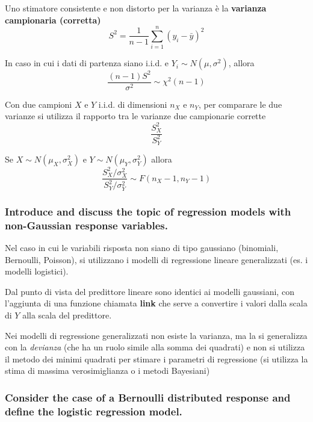 \documentclass[
]{article}
\begin{document}
Uno stimatore consistente e non distorto per la varianza è la
\textbf{varianza campionaria (corretta)}
\[S^2 = \frac{1}{n-1}\sum_{i=1}^n (y_i - \bar{y})^2\]

In caso in cui i dati di partenza siano i.i.d. e
\(Y_i \sim N(\mu, \sigma^2)\), allora
\[ \frac{(n-1)S^2}{\sigma^2} \sim \chi^2(n-1)\]

Con due campioni \(X\) e \(Y\) i.i.d. di dimensioni \(n_X\) e \(n_Y\),
per comparare le due varianze si utilizza il rapporto tra le varianze
due campionarie corrette \[\frac{S_X^2}{S_Y^2}\]

Se \(X \sim N(\mu_X, \sigma_X^2)\) e \(Y \sim N(\mu_Y, \sigma_Y^2)\)
allora
\[ \frac{S_X^2/\sigma_X^2}{S_Y^2/\sigma_Y^2} \sim F(n_X-1, n_Y -1) \]

\hypertarget{introduce-and-discuss-the-topic-of-regression-models-with-non-gaussian-response-variables.}{%
\subsubsection{Introduce and discuss the topic of regression models with
non-Gaussian response
variables.}\label{introduce-and-discuss-the-topic-of-regression-models-with-non-gaussian-response-variables.}}

Nel caso in cui le variabili risposta non siano di tipo gaussiano
(binomiali, Bernoulli, Poisson), si utilizzano i modelli di regressione
lineare generalizzati (es. i modelli logistici).

Dal punto di vista del predittore lineare sono identici ai modelli
gaussiani, con l'aggiunta di una funzione chiamata \textbf{link} che
serve a convertire i valori dalla scala di \(Y\) alla scala del
predittore.

Nei modelli di regressione generalizzati non esiste la varianza, ma la
si generalizza con la \emph{devianza} (che ha un ruolo simile alla somma
dei quadrati) e non si utilizza il metodo dei minimi quadrati per
stimare i parametri di regressione (si utilizza la stima di massima
verosimiglianza o i metodi Bayesiani)

\hypertarget{consider-the-case-of-a-bernoulli-distributed-response-and-define-the-logistic-regression-model.}{%
\subsubsection{Consider the case of a Bernoulli distributed response and
define the logistic regression
model.}\label{consider-the-case-of-a-bernoulli-distributed-response-and-define-the-logistic-regression-model.}}
\end{document}
